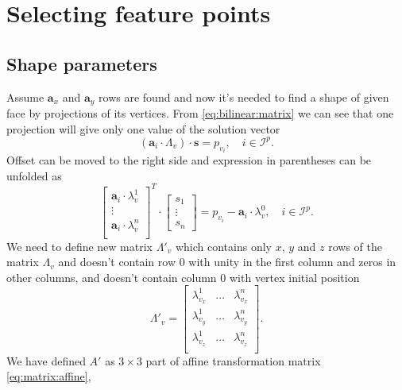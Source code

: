 \section{Selecting feature points}

\subsection{Shape parameters}

Assume $\pmb{a}_x$ and $\pmb{a}_y$ rows are found
and now it's needed to find a shape of given face
by projections of its vertices.
From \eqref{eq:bilinear:matrix} we can see that one projection
will give only one value of the solution vector
\begin{equation*}
  \left( \pmb{a}_i \cdot \Lambda_v \right) \cdot \pmb{s} = p_{v_i},
  \quad i \in \mathcal{I}^p.
\end{equation*}
Offset can be moved to the right side and
expression in parentheses can be unfolded as
\begin{equation}\label{eq:linear:shape:first}
  \begin{bmatrix}
    \pmb{a}_i \cdot \lambda^1_v \\
    \vdots \\
    \pmb{a}_i \cdot \lambda^n_v \\
  \end{bmatrix}^T
  \cdot \begin{bmatrix}
    s_1 \\
    \vdots \\
    s_n
  \end{bmatrix}
  = p_{v_i} - \pmb{a}_i \cdot \lambda^0_v,
  \quad i \in \mathcal{I}^p.
\end{equation}
We need to define new matrix $\Lambda'_v$ which contains only $x$, $y$ and $z$
rows of the matrix $\Lambda_v$ and doesn't contain row $0$
with unity in the first column and zeros in other columns,
and doesn't contain column $0$ with vertex initial position
\begin{equation*}
  \Lambda'_v = \begin{bmatrix}
    \lambda^1_{v_x} & \dots & \lambda^n_{v_x} \\
    \lambda^1_{v_y} & \dots & \lambda^n_{v_y} \\
    \lambda^1_{v_z} & \dots & \lambda^n_{v_z} \\
  \end{bmatrix}.
\end{equation*}
We have defined $A'$ as $3 \times 3$ part of
affine transformation matrix \eqref{eq:matrix:affine},
